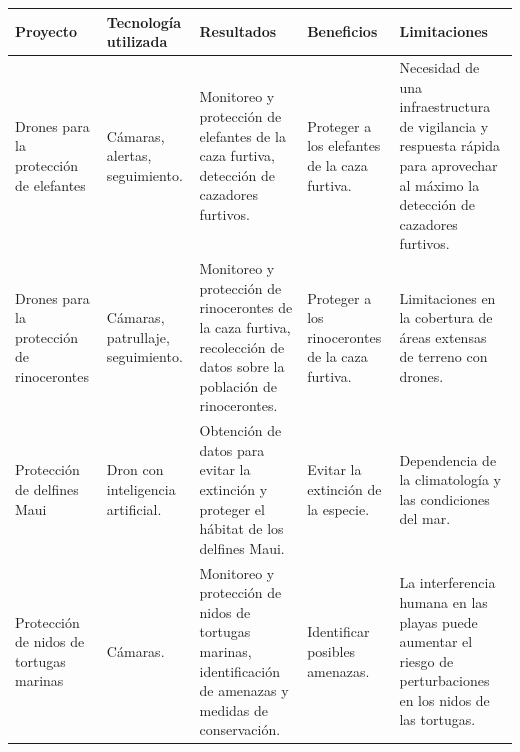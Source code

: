 \begin{table}[]
\centering

\begin{tabular}{|m{}|m{}|m{}|m{}|m{}|}
\hline
Proyecto                                               & Tecnología utilizada                         & Resultados                                                                                                                                                                                  & Beneficios                                      & Limitaciones                                                                                                                            \\ \hline

\hline
Drones para la protección de elefantes                 & Cámaras, alertas, seguimiento.               & Monitoreo y protección de elefantes de la caza furtiva, detección de cazadores furtivos.                                                                                                    & Proteger a los elefantes de la caza furtiva.    & Necesidad de una infraestructura de vigilancia y respuesta rápida para aprovechar al máximo la detección de cazadores furtivos.         \\ \hline
Drones para la protección de rinocerontes              & Cámaras, patrullaje, seguimiento.            & Monitoreo y protección de rinocerontes de la caza furtiva, recolección de datos sobre la población de rinocerontes.                                                                         & Proteger a los rinocerontes de la caza furtiva. & Limitaciones en la cobertura de áreas extensas de terreno con drones.                                                                   \\ \hline
Protección de delfines Maui                            & Dron con inteligencia artificial.            & Obtención de datos para evitar la extinción y proteger el hábitat de los delfines Maui.                                                                                                     & Evitar la extinción de la especie.              & Dependencia de la climatología y las condiciones del mar.                                                                               \\ \hline
Protección de nidos de tortugas marinas                & Cámaras.                                     & Monitoreo y protección de nidos de tortugas marinas, identificación de amenazas y medidas de conservación.                                                                                  & Identificar posibles amenazas.                  & La interferencia humana en las playas puede aumentar el riesgo de perturbaciones en los nidos de las tortugas.                          \\ \hline

\end{tabular}
\end{table}






